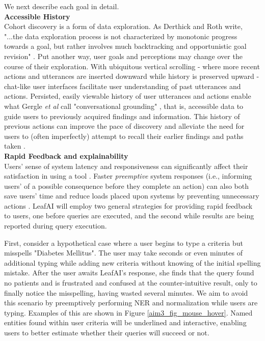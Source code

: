\documentclass[../main.tex]{subfiles}
\begin{document}
\noindent We next describe each goal in detail. \\

\noindent \textbf{Accessible History} \\
Cohort discovery is a form of data exploration. As Derthick and Roth write, "...the data exploration process is not characterized by monotonic progress towards a goal, but rather involves much backtracking and opportunistic goal revision" \cite{derthick2001enhancing}. Put another way, user goals and perceptions may change over the course of their exploration. With ubiquitous vertical scrolling - where more recent actions and utterances are inserted downward while history is preserved upward - chat-like user interfaces facilitate user understanding of past utterances and actions. Persisted, easily viewable history of user utterances and actions enable what Gergle \textit{et al} call "conversational grounding" \cite{gergle2004persistence}, that is, accessible data to guide users to previously acquired findings and information. This history of previous actions can improve the pace of discovery and alleviate the need for users to (often imperfectly) attempt to recall their earlier findings and paths taken \cite{hill1994history, gergle2004persistence}. \\

\noindent \textbf{Rapid Feedback and explainability} \\
Users' sense of system latency and responsiveness can significantly affect their satisfaction in using a tool \cite{li2019effects, arapakis2014impact, shneiderman1984response}. Faster \textit{preemptive} system responses (i.e., informing users' of a possible consequence before they complete an action) can also both save users' time and reduce loads placed upon systems by preventing unnecessary actions \cite{lempel2003predictive, diaz2016search}. LeafAI will employ two general strategies for providing rapid feedback to users, one before queries are executed, and the second while results are being reported during query execution.

First, consider a hypothetical case where a user begins to type a criteria but misspells "Diabetes Mellitus". The user may take seconds or even minutes of additional typing while adding new criteria without knowing of the initial spelling mistake. After the user awaits LeafAI's response, she finds that the query found no patients and is frustrated and confused at the counter-intuitive result, only to finally notice the misspelling, having wasted several minutes. We aim to avoid this scenario by preemptively performing NER and normalization while users are typing. Examples of this are shown in Figure \ref{aim3_fig_mouse_hover}. Named entities found within user criteria will be underlined and interactive, enabling users to better estimate whether their queries will succeed or not.
\end{document}
